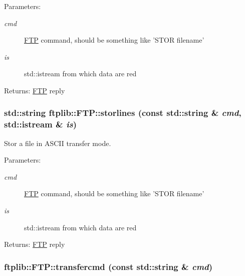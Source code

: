 \begin{Desc}
\item[Parameters:]
\begin{description}
\item[{\em cmd}]\hyperlink{classftplib_1_1FTP}{FTP} command, should be something like 'STOR filename' \item[{\em is}]std::istream from which data are red \end{description}
\end{Desc}
\begin{Desc}
\item[Returns:]\hyperlink{classftplib_1_1FTP}{FTP} reply \end{Desc}
\hypertarget{classftplib_1_1FTP_956c5fa0546d7a6a2db0b4dee28f6868}{
\subsubsection[{storlines}]{\setlength{\rightskip}{0pt plus 5cm}std::string ftplib::FTP::storlines (const std::string \& {\em cmd}, \/  std::istream \& {\em is})}}
\label{classftplib_1_1FTP_956c5fa0546d7a6a2db0b4dee28f6868}


Stor a file in ASCII transfer mode. 

\begin{Desc}
\item[Parameters:]
\begin{description}
\item[{\em cmd}]\hyperlink{classftplib_1_1FTP}{FTP} command, should be something like 'STOR filename' \item[{\em is}]std::istream from which data are red \end{description}
\end{Desc}
\begin{Desc}
\item[Returns:]\hyperlink{classftplib_1_1FTP}{FTP} reply \end{Desc}
\hypertarget{classftplib_1_1FTP_e2c47d7a17f53916d81e0f1e289c9b7c}{
\subsubsection[{transfercmd}]{ ftplib::FTP::transfercmd (const std::string \& {\em cmd})}}
\label{classftplib_1_1FTP_e2c47d7a17f53916d81e0f1e289c9b7c}


